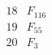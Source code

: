\documentclass{article}
\begin{document}
{$$\begin{array}{|r|*{7}{r|}}
\\
\hline
18 
 & F_{116} &
 & 
 & 
 & 
 & 
 & 
\\
\hline
19 
 & F_{55} &
 & 
 & 
 & 
 & 
 & 
\\
\hline
20 
 &F_{3}  &
 & 
 & 
 & 

\end{array}$$}
\end{document}
